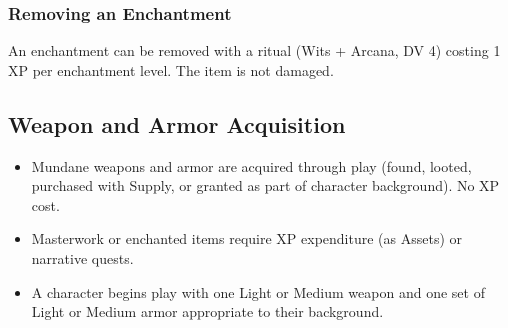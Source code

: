 \subsubsection{Removing an Enchantment}
An enchantment can be removed with a ritual (Wits + Arcana, DV 4) costing 1 XP per enchantment level. The item is not damaged.

\subsection{Weapon and Armor Acquisition}

\begin{itemize}
  \item Mundane weapons and armor are acquired through play (found, looted, purchased with Supply, or granted as part of character background). No XP cost.
  \item Masterwork or enchanted items require XP expenditure (as Assets) or narrative quests.
  \item A character begins play with one Light or Medium weapon and one set of Light or Medium armor appropriate to their background.
\end{itemize}